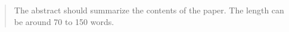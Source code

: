 
\begin{abstract}
The abstract should summarize the contents of the paper. The length can be around 70 to 150 words.

\end{abstract}